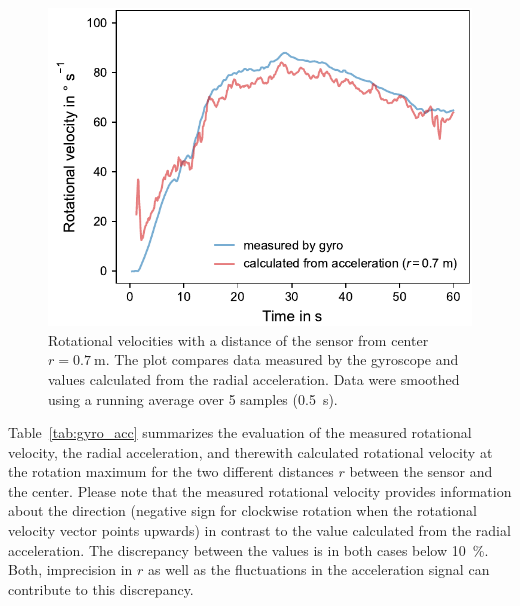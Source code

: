 \documentclass[DIV=14]{scrartcl}
\begin{document}
    \begin{figure}[h!]
        \centering
        \includegraphics[width=.6\textwidth]{plots/gyro_2.pdf}
        \caption{Rotational velocities with a distance of the sensor from center $r=\SI{0.7}{\metre}$. The plot compares data measured by the gyroscope and values calculated from the radial acceleration. Data were smoothed using a running average over 5 samples (\SI{0.5}{\second}).}
        \label{fig:gyro_acc}
    \end{figure}

    \clearpage


    Table~\ref{tab:gyro_acc} summarizes the evaluation of the measured rotational velocity, the radial acceleration, and therewith calculated rotational velocity at the rotation maximum for the two different distances $r$ between the sensor and the center. Please note that the measured rotational velocity provides information about the direction (negative sign for clockwise rotation when the rotational velocity vector points upwards) in contrast to the value calculated from the radial acceleration. The discrepancy between the values is in both cases below \SI{10}{\percent}. Both, imprecision in $r$ as well as the fluctuations in the acceleration signal can contribute to this discrepancy.

    \vspace{2em}
\end{document}

